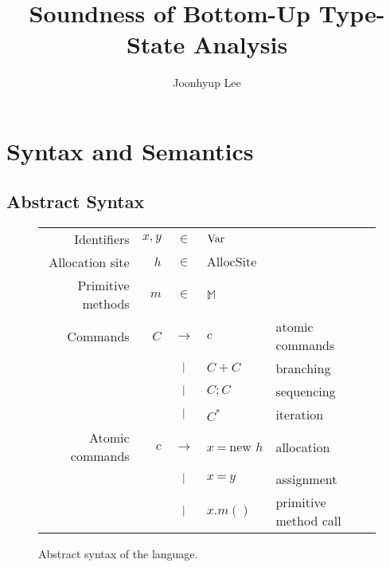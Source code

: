 \documentclass{article}
\title{Soundness of Bottom-Up Type-State Analysis}
\author{Joonhyup Lee}
\begin{document}
\maketitle
\section{Syntax and Semantics}
\subsection{Abstract Syntax}
\begin{figure}[htb]
  \centering
  \begin{tabular}{rrcll}
    Identifiers       & $x,y$ & $\in$         & $\text{Var}$                                            \\
    Allocation site   & $h$   & $\in$         & $\text{AllocSite}$                                    \\
    Primitive methods & $m$   & $\in$         & $\mathbb{M}$                                          \\
    Commands          & $C$   & $\rightarrow$ & $c$                           & atomic commands       \\
                      &       & $|$       & $C+C$                         & branching             \\
                      &       & $|$       & $C;C$                         & sequencing            \\
                      &       & $|$       & $C^*$                         & iteration             \\
    Atomic commands   & $c$   & $\rightarrow$ & $x\:\texttt{=}\:\text{new }h$ & allocation            \\
                      &       & $|$       & $x\:\texttt{=}\:y$            & assignment            \\
                      &       & $|$       & $x.m()$                       & primitive method call
  \end{tabular}
  \caption{Abstract syntax of the language.}
  \label{fig:syntax}
\end{figure}
\end{document}
